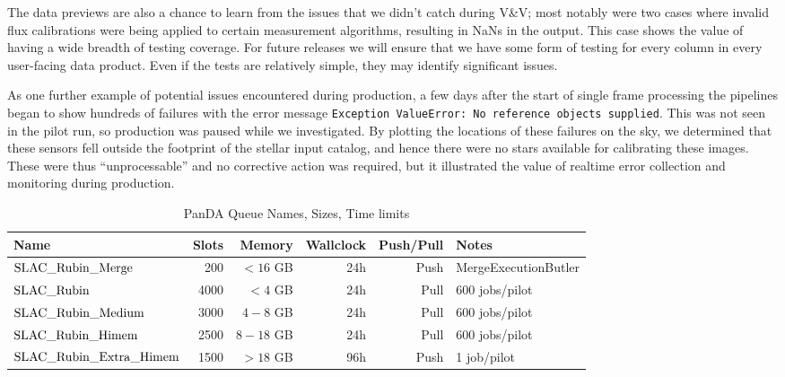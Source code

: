 The data previews are also a chance to learn from the issues that we didn’t catch during V\&V; most
notably were two cases where invalid flux calibrations were being applied to certain measurement
algorithms, resulting in NaNs in the output. This case shows the value of having a wide breadth of
testing coverage. For future releases we will ensure that we have some form of testing for every
column in every user-facing data product. Even if the tests are relatively simple, they may identify
significant issues.

As one further example of potential issues encountered during production, a few days after the start
of single frame processing the pipelines began to show hundreds of failures with the error message
\texttt{Exception ValueError: No reference objects supplied}. This was not seen in the pilot run, so
production was paused while we investigated. By plotting the locations of these failures on the sky,
we determined that these sensors fell outside the footprint of the stellar input catalog, and hence
there were no stars available for calibrating these images. These were thus “unprocessable” and no
corrective action was required, but it illustrated the value of realtime error collection and
monitoring during production.

\normalsize
\begin{center}
\begin{longtable}{|l|r|r|r|r|l|}
\caption{PanDA Queue Names, Sizes, Time limits} \label{tab:memorynotes}\\
\hline
\textbf{Name}&\textbf{Slots}&\textbf{Memory}&\textbf{Wallclock}&\textbf{Push/Pull}&\textbf{Notes} \\
\hline
$\rm SLAC\_Rubin\_Merge$ & 200 & $<16$ GB & 24h & Push & MergeExecutionButler \\
$\rm SLAC\_Rubin$ & 4000 & $<4$ GB & 24h & Pull & 600 jobs/pilot \\
$\rm SLAC\_Rubin\_Medium$ & 3000 & $4-8$ GB & 24h & Pull &  600 jobs/pilot\\
$\rm SLAC\_Rubin\_Himem$ & 2500& $8-18$ GB & 24h & Pull &  600 jobs/pilot \\
$\rm SLAC\_Rubin\_Extra\_Himem$ & 1500 & $>18$ GB & 96h & Push & 1 job/pilot \\
\hline
\end{longtable}
\end{center}
\normalsize
